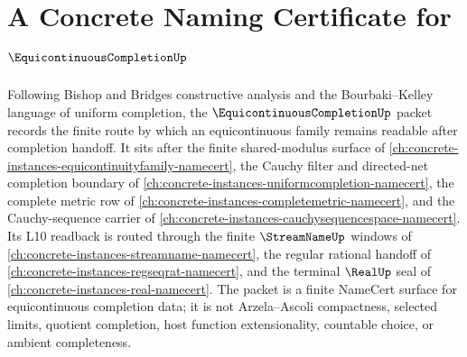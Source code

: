 \chapter{A Concrete Naming Certificate for $\EquicontinuousCompletionUp$}
\label{ch:concrete-instances-equicontinuous-completion-namecert}

Following Bishop and Bridges constructive analysis and the Bourbaki--Kelley
language of uniform completion, the $\EquicontinuousCompletionUp$ packet
records the finite route by which an equicontinuous family remains readable
after completion handoff. It sits after the finite shared-modulus surface of
\autoref{ch:concrete-instances-equicontinuityfamily-namecert}, the Cauchy
filter and directed-net completion boundary of
\autoref{ch:concrete-instances-uniformcompletion-namecert}, the complete
metric row of \autoref{ch:concrete-instances-completemetric-namecert}, and
the Cauchy-sequence carrier of
\autoref{ch:concrete-instances-cauchysequencespace-namecert}. Its L10
readback is routed through the finite $\StreamNameUp$ windows of
\autoref{ch:concrete-instances-streamname-namecert}, the regular rational
handoff of \autoref{ch:concrete-instances-regseqrat-namecert}, and the
terminal $\RealUp$ seal of \autoref{ch:concrete-instances-real-namecert}.
The packet is a finite NameCert surface for equicontinuous completion data;
it is not Arzela--Ascoli compactness, selected limits, quotient completion,
host function extensionality, countable choice, or ambient completeness.

